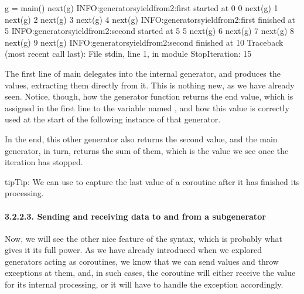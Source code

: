 \documentclass[a4paper,10pt,english]{sphinxmanual}
\begin{document}
\begin{sphinxVerbatim}[commandchars=\\\{\}]
\PYGZgt{}\PYGZgt{}\PYGZgt{} g = main()
\PYGZgt{}\PYGZgt{}\PYGZgt{} next(g)
INFO:generators\PYGZus{}yieldfrom\PYGZus{}2:first started at 0
0
\PYGZgt{}\PYGZgt{}\PYGZgt{} next(g)
1
\PYGZgt{}\PYGZgt{}\PYGZgt{} next(g)
2
\PYGZgt{}\PYGZgt{}\PYGZgt{} next(g)
3
\PYGZgt{}\PYGZgt{}\PYGZgt{} next(g)
4
\PYGZgt{}\PYGZgt{}\PYGZgt{} next(g)
INFO:generators\PYGZus{}yieldfrom\PYGZus{}2:first finished at 5
INFO:generators\PYGZus{}yieldfrom\PYGZus{}2:second started at 5
5
\PYGZgt{}\PYGZgt{}\PYGZgt{} next(g)
6
\PYGZgt{}\PYGZgt{}\PYGZgt{} next(g)
7
\PYGZgt{}\PYGZgt{}\PYGZgt{} next(g)
8
\PYGZgt{}\PYGZgt{}\PYGZgt{} next(g)
9
\PYGZgt{}\PYGZgt{}\PYGZgt{} next(g)
INFO:generators\PYGZus{}yieldfrom\PYGZus{}2:second finished at 10
Traceback (most recent call last):
File \PYGZdq{}\PYGZlt{}stdin\PYGZgt{}\PYGZdq{}, line 1, in \PYGZlt{}module\PYGZgt{}
StopIteration: 15
\end{sphinxVerbatim}

The first line of main delegates into the internal generator, and produces the values,
extracting them directly from it. This is nothing new, as we have already seen. Notice,
though, how the  generator function returns the end value, which is assigned
in the first line to the variable named , and how this value is correctly used at the
start of the following instance of that generator.

In the end, this other generator also returns the second  value, and the main
generator, in turn, returns the sum of them, which is the value we see once the
iteration has stopped.

\begin{sphinxadmonition}{tip}{Tip:}
We can use  to capture the last value of a coroutine after it has finished its processing.
\end{sphinxadmonition}


\paragraph{3.2.2.3. Sending and receiving data to and from a sub\sphinxhyphen{}generator}
\label{\detokenize{chapters/7_generators/index:sending-and-receiving-data-to-and-from-a-sub-generator}}
Now, we will see the other nice feature of the  syntax, which is probably what
gives it its full power. As we have already introduced when we explored generators acting
as coroutines, we know that we can send values and throw exceptions at them, and, in such
cases, the coroutine will either receive the value for its internal processing, or it will have to
handle the exception accordingly.
\end{document}
